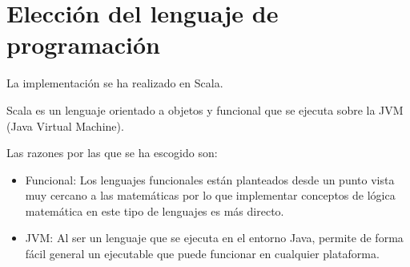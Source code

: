 
\section*{Elección del lenguaje de programación}


	La implementación se ha realizado en Scala.
	
	Scala es un lenguaje orientado a objetos y funcional que se ejecuta sobre la JVM (Java Virtual Machine).
	
	Las razones por las que se ha escogido son:

	\begin{itemize}
	
		\item Funcional: Los lenguajes funcionales están planteados desde un punto vista muy cercano a las matemáticas por lo que implementar
		conceptos de lógica matemática en este tipo de lenguajes es más directo.
		
		\item JVM: Al ser un lenguaje que se ejecuta en el entorno Java, permite de forma fácil general un ejecutable que puede funcionar en cualquier plataforma.
	
	\end{itemize}



 